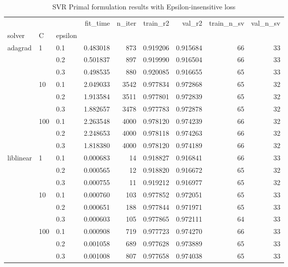 \begin{table}[H]
\centering
\caption{SVR Primal formulation results with Epsilon-insensitive loss}
\label{primal_svr_eps_cv_results}
\begin{tabular}{lllrrrrrr}
\toprule
          &     &     &  fit\_time &  n\_iter &  train\_r2 &    val\_r2 &  train\_n\_sv &  val\_n\_sv \\
solver & C & epsilon &           &         &           &           &             &           \\
\midrule
adagrad & 1   & 0.1 &  0.483018 &     873 &  0.919206 &  0.915684 &          66 &        33 \\
          &     & 0.2 &  0.501837 &     897 &  0.919990 &  0.916504 &          66 &        33 \\
          &     & 0.3 &  0.498535 &     880 &  0.920085 &  0.916655 &          65 &        33 \\
          & 10  & 0.1 &  2.049033 &    3542 &  0.977834 &  0.972868 &          65 &        32 \\
          &     & 0.2 &  1.913584 &    3511 &  0.977801 &  0.972839 &          65 &        32 \\
          &     & 0.3 &  1.882657 &    3478 &  0.977783 &  0.972878 &          65 &        32 \\
          & 100 & 0.1 &  2.263548 &    4000 &  0.978120 &  0.974239 &          66 &        32 \\
          &     & 0.2 &  2.248653 &    4000 &  0.978118 &  0.974263 &          66 &        32 \\
          &     & 0.3 &  1.818380 &    4000 &  0.978120 &  0.974189 &          66 &        32 \\
liblinear & 1   & 0.1 &  0.000683 &      14 &  0.918827 &  0.916841 &          66 &        33 \\
          &     & 0.2 &  0.000565 &      12 &  0.918820 &  0.916672 &          65 &        32 \\
          &     & 0.3 &  0.000755 &      11 &  0.919212 &  0.916977 &          65 &        32 \\
          & 10  & 0.1 &  0.000760 &     103 &  0.977852 &  0.972051 &          65 &        33 \\
          &     & 0.2 &  0.000651 &     188 &  0.977844 &  0.971971 &          65 &        33 \\
          &     & 0.3 &  0.000603 &     105 &  0.977865 &  0.972111 &          64 &        33 \\
          & 100 & 0.1 &  0.000908 &     719 &  0.977723 &  0.974270 &          66 &        33 \\
          &     & 0.2 &  0.001058 &     689 &  0.977628 &  0.973889 &          65 &        33 \\
          &     & 0.3 &  0.001008 &     807 &  0.977658 &  0.974038 &          65 &        33 \\
\bottomrule
\end{tabular}
\end{table}
